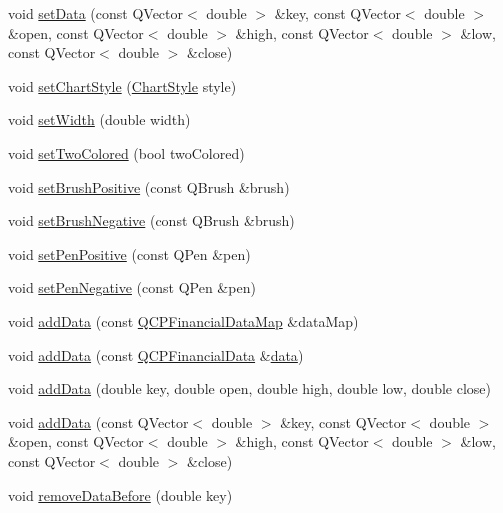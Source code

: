 \begin{DoxyCompactItemize}
\item 
void \hyperlink{class_q_c_p_financial_a886881339d6447432af55adaad748c3c}{set\+Data} (const Q\+Vector$<$ double $>$ \&key, const Q\+Vector$<$ double $>$ \&open, const Q\+Vector$<$ double $>$ \&high, const Q\+Vector$<$ double $>$ \&low, const Q\+Vector$<$ double $>$ \&close)
\item 
void \hyperlink{class_q_c_p_financial_a5a59175d36279d71596e64d7bb65596f}{set\+Chart\+Style} (\hyperlink{class_q_c_p_financial_a0f800e21ee98d646dfc6f8f89d10ebfb}{Chart\+Style} style)
\item 
void \hyperlink{class_q_c_p_financial_a99633f8bac86a61d534ae5eeb1a3068f}{set\+Width} (double width)
\item 
void \hyperlink{class_q_c_p_financial_a138e44aac160a17a9676652e240c5f08}{set\+Two\+Colored} (bool two\+Colored)
\item 
void \hyperlink{class_q_c_p_financial_a5ebff2b1764efd07cc44942e67821829}{set\+Brush\+Positive} (const Q\+Brush \&brush)
\item 
void \hyperlink{class_q_c_p_financial_a8bbdd87629f9144b3ef51af660c0961a}{set\+Brush\+Negative} (const Q\+Brush \&brush)
\item 
void \hyperlink{class_q_c_p_financial_ac58aa3adc7a35aab0088764b840683e5}{set\+Pen\+Positive} (const Q\+Pen \&pen)
\item 
void \hyperlink{class_q_c_p_financial_afe5c07e94ccea01a75b3a2476993c346}{set\+Pen\+Negative} (const Q\+Pen \&pen)
\item 
void \hyperlink{class_q_c_p_financial_a1a83396f97fcc68f2b7aa8d9782feffe}{add\+Data} (const \hyperlink{qcustomplot_8h_a745c09823fae0974b50beca9bc3b3d7d}{Q\+C\+P\+Financial\+Data\+Map} \&data\+Map)
\item 
void \hyperlink{class_q_c_p_financial_a3b6144b48a6a8e63236fc5bf70d40c00}{add\+Data} (const \hyperlink{class_q_c_p_financial_data}{Q\+C\+P\+Financial\+Data} \&\hyperlink{class_q_c_p_financial_a528c81578e4f25999a9169127763cfd4}{data})
\item 
void \hyperlink{class_q_c_p_financial_a688bbd052e00a02954ddb0068b378170}{add\+Data} (double key, double open, double high, double low, double close)
\item 
void \hyperlink{class_q_c_p_financial_aa1abe3bdafb297497f09cdbdc4db3958}{add\+Data} (const Q\+Vector$<$ double $>$ \&key, const Q\+Vector$<$ double $>$ \&open, const Q\+Vector$<$ double $>$ \&high, const Q\+Vector$<$ double $>$ \&low, const Q\+Vector$<$ double $>$ \&close)
\item 
void \hyperlink{class_q_c_p_financial_a097c0383c7c1e9042ca7f93cb439d15a}{remove\+Data\+Before} (double key)

\end{DoxyCompactItemize}
